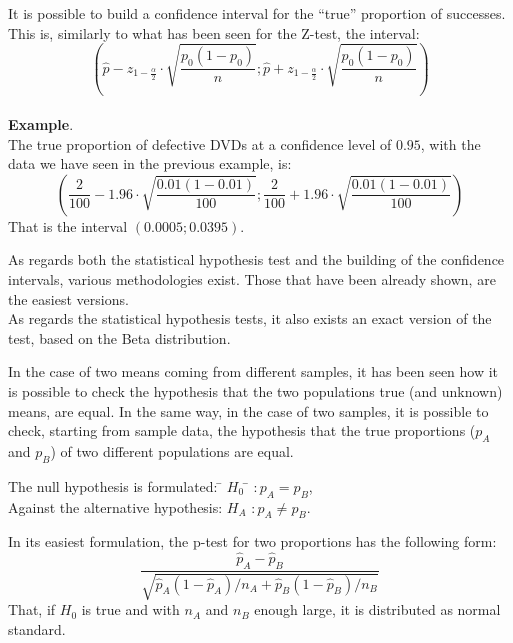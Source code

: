 \begin{frame}
  \vspace{0.25cm}
  It is possible to build a confidence interval for the ``true'' proportion of successes. This is, similarly to what has been seen for the Z-test, the interval:
  $$ \left( \hat{p} - z_{1-\frac{\alpha}{2}} \cdot \sqrt{\frac{p_0 (1-p_0)}{n}}; \hat{p} + z_{1-\frac{\alpha}{2}} \cdot \sqrt{\frac{p_0 (1-p_0)}{n}} \right) $$\\
  \vspace{0.25cm}
  \textbf{Example}.\\
  The true proportion of defective DVDs at a confidence level of $ 0.95 $, with the data we have seen in the previous example, is:
  $$ \left( \frac{2}{100} - 1.96 \cdot \sqrt{\frac{0.01 (1-0.01)}{100}}; \frac{2}{100} + 1.96 \cdot \sqrt{\frac{0.01 (1-0.01)}{100}} \right) $$
  That is the interval $ \left(0.0005; 0.0395\right) $.
\end{frame}

\begin{frame}
  \vspace{0.5cm}
  As regards both the statistical hypothesis test and the building of the confidence intervals, various methodologies exist. Those that have been already shown, are the easiest versions.\\
  \vspace{0.5cm}
  As regards the statistical hypothesis tests, it also exists an exact version of the test, based on the Beta distribution.
\end{frame}


\begin{frame}
  In the case of two means coming from different samples, it has been seen how it is possible to check the hypothesis that the two populations true (and unknown) means, are equal. In the same way, in the case of two samples, it is possible to check, starting from sample data, the hypothesis that the true proportions ($ p_A $ and $ p_B $) of two different populations are equal.\\
  \vspace{-.5cm}
  \begin{tabbing}
    The null hypothesis is formulated: \=  $ H_0 $ \= $ :  p_A = p_B $,\\
    Against the alternative hypothesis: \>  $ H_A $ \> $ :  p_A \neq p_B $.\\
  \end{tabbing}
  \vspace{-.5cm}
  In its easiest formulation, the p-test for two proportions has the following form:
  $$ \frac{\hat{p}_A - \hat{p}_B}{\sqrt{\hat{p}_A (1 - \hat{p}_A) / n_A + \hat{p}_B (1 - \hat{p}_B) / n_B}} $$
  That, if $ H_0 $ is true and with $ n_A $ and $ n_B $ enough large, it is distributed as normal standard.
\end{frame}

